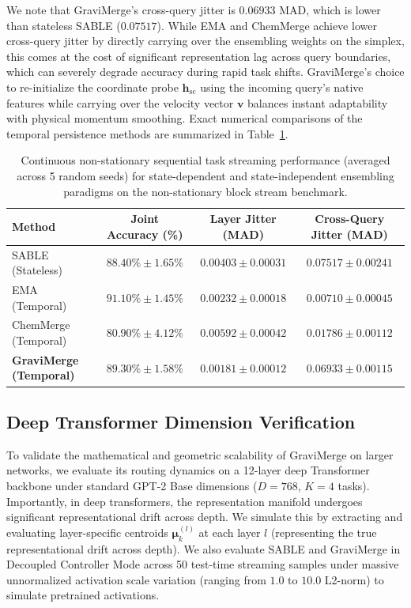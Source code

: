 We note that GraviMerge's cross-query jitter is $0.06933$ MAD, which is lower than stateless SABLE ($0.07517$). While EMA and ChemMerge achieve lower cross-query jitter by directly carrying over the ensembling weights on the simplex, this comes at the cost of significant representation lag across query boundaries, which can severely degrade accuracy during rapid task shifts. GraviMerge's choice to re-initialize the coordinate probe $\mathbf{h}_{\text{sc}}$ using the incoming query's native features while carrying over the velocity vector $\mathbf{v}$ balances instant adaptability with physical momentum smoothing. Exact numerical comparisons of the temporal persistence methods are summarized in Table~\ref{tab:temporal_results}.

\begin{table}[h]
\centering
\caption{Continuous non-stationary sequential task streaming performance (averaged across 5 random seeds) for state-dependent and state-independent ensembling paradigms on the non-stationary block stream benchmark.}
\label{tab:temporal_results}
\vskip 0.05in
\begin{small}
\begin{sc}
\begin{tabular}{lccc}
\toprule
Method & Joint Accuracy (\%) & Layer Jitter (MAD) & Cross-Query Jitter (MAD) \\
\midrule
SABLE (Stateless) & $88.40\% \pm 1.65\%$ & $0.00403 \pm 0.00031$ & $0.07517 \pm 0.00241$ \\
EMA (Temporal) & $91.10\% \pm 1.45\%$ & $0.00232 \pm 0.00018$ & $0.00710 \pm 0.00045$ \\
ChemMerge (Temporal) & $80.90\% \pm 4.12\%$ & $0.00592 \pm 0.00042$ & $0.01786 \pm 0.00112$ \\
\textbf{GraviMerge (Temporal)} & $\mathbf{89.30\% \pm 1.58\%}$ & $\mathbf{0.00181 \pm 0.00012}$ & $\mathbf{0.06933 \pm 0.00115}$ \\
\bottomrule
\end{tabular}
\end{sc}
\end{small}
\end{table}

\subsection{Deep Transformer Dimension Verification}
\label{sec:appendix_transformer_verification}
To validate the mathematical and geometric scalability of GraviMerge on larger networks, we evaluate its routing dynamics on a 12-layer deep Transformer backbone under standard GPT-2 Base dimensions ($D=768$, $K=4$ tasks). Importantly, in deep transformers, the representation manifold undergoes significant representational drift across depth. We simulate this by extracting and evaluating layer-specific centroids $\boldsymbol{\mu}_k^{(l)}$ at each layer $l$ (representing the true representational drift across depth). We also evaluate SABLE and GraviMerge in Decoupled Controller Mode across 50 test-time streaming samples under massive unnormalized activation scale variation (ranging from $1.0$ to $10.0$ L2-norm) to simulate pretrained activations.

